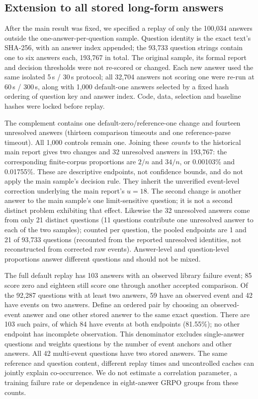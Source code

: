 \documentclass[10pt,a4paper]{article}
\begin{document}
\subsection{Extension to all stored long-form answers}
\label{sec:allanswers}

After the main result was fixed, we specified a replay of only the 100,034
answers outside the one-answer-per-question sample. Question identity is
the exact text's SHA-256, with an answer index appended; the 93,733 question
strings contain one to six answers each, 193,767 in total. The original
sample, its formal report and decision thresholds were not re-scored or
changed. Each new answer used the same isolated 5\,s / 30\,s protocol;
all 32,704 answers not scoring one were re-run at 60\,s / 300\,s, along with
1,000 default-one answers selected by a fixed hash ordering of question
key and answer index. Code, data, selection and baseline hashes were locked
before replay.

The complement contains one default-zero/reference-one change and fourteen
unresolved answers (thirteen comparison timeouts and one reference-parse
timeout). All 1,000 controls remain one. Joining these \emph{counts} to the
historical main report gives two changes and 32 unresolved answers in 193,767:
the corresponding finite-corpus proportions are $2/n$ and $34/n$, or
0.00103\% and 0.01755\%. These are descriptive endpoints, not confidence
bounds, and do not apply the main sample's decision rule. They inherit the
unverified event-level correction underlying the main report's $u=18$.
The second change
is another answer to the main sample's one limit-sensitive question;
it is not a second distinct problem exhibiting that effect. Likewise the 32
unresolved answers come from only 21 distinct questions (11 questions
contribute one unresolved answer to each of the two samples); counted per
question, the pooled endpoints are 1 and 21 of 93,733 questions
(recounted from the reported unresolved identities, not reconstructed
from corrected raw events). Answer-level and question-level proportions answer
different questions and should not be mixed.

The full default replay has 103 answers with an observed library failure
event; 85 score zero and eighteen still score one through another accepted
comparison. Of the 92,287 questions with at least two answers, 59 have an
observed event and 42 have events on two answers. Define an ordered pair
by choosing an observed-event answer and one other stored answer to the
same exact question. There are 103 such pairs, of which 84 have events at
both endpoints (81.55\%); no other endpoint has incomplete observation.
This denominator excludes single-answer questions and weights questions
by the number of event anchors and other answers. All 42 multi-event
questions have two stored answers. The same reference and question content,
different replay times and uncontrolled caches can jointly explain
co-occurrence. We do not estimate a correlation parameter, a training
failure rate or dependence in eight-answer GRPO groups from these counts.
\end{document}
